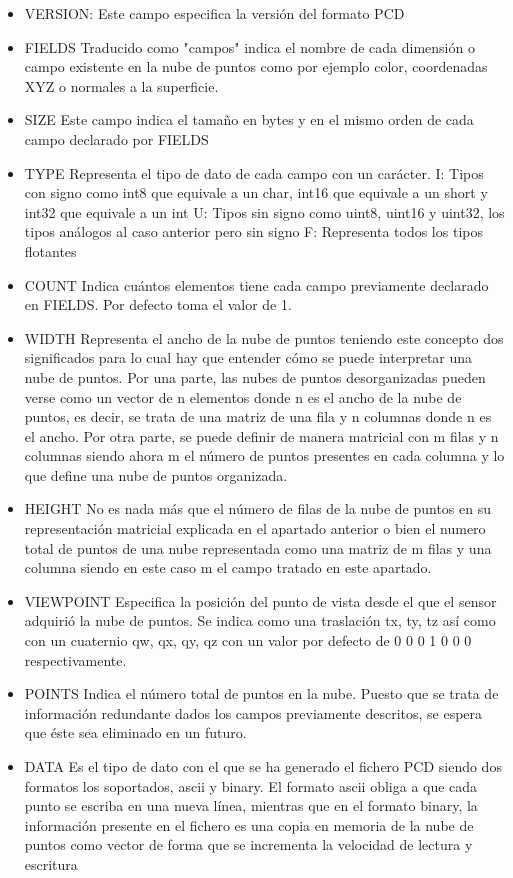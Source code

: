 \begin{itemize}
\item VERSION:
Este campo especifica la versión del formato PCD

\item FIELDS
Traducido como "campos" indica el nombre de cada dimensión o campo existente en la nube de puntos como por ejemplo color, coordenadas XYZ o normales a la superficie.

\item SIZE 
Este campo indica el tamaño en bytes y en el mismo orden de cada campo declarado por FIELDS 

\item TYPE
Representa el tipo de dato de cada campo con un carácter. 
I: Tipos con signo como int8 que equivale a un char, int16 que equivale a un short y int32 que equivale a un int
U: Tipos sin signo como uint8, uint16 y uint32, los tipos análogos al caso anterior pero sin signo
F: Representa todos los tipos flotantes

\item COUNT 
Indica cuántos elementos tiene cada campo previamente declarado en FIELDS. Por defecto toma el valor de 1.

\item WIDTH
Representa el ancho de la nube de puntos teniendo este concepto dos significados para lo cual hay que entender cómo se puede interpretar una nube de puntos. Por una parte, las nubes de puntos desorganizadas pueden verse como un vector de n elementos donde n es el ancho de la nube de puntos, es decir, se trata de una matriz de una fila y n columnas donde n es el ancho. Por otra parte, se puede definir de manera matricial con m filas y n columnas siendo ahora m el número de puntos presentes en cada columna y lo que define una nube de puntos organizada.

\item HEIGHT
No es nada más que el número de filas de la nube de puntos en su representación matricial explicada en el apartado anterior o bien el numero total de puntos de una nube representada como una matriz de m filas y una columna siendo en este caso m el campo tratado en este apartado.

\item VIEWPOINT
Especifica la posición del punto de vista desde el que el sensor adquirió la nube de puntos. Se indica como una traslación tx, ty, tz así como con un cuaternio qw, qx, qy, qz con un valor por defecto de 0 0 0 1 0 0 0 respectivamente.

\item POINTS
Indica el número total de puntos en la nube. Puesto que se trata de información redundante dados los campos previamente descritos, se espera que éste sea eliminado en un futuro.

\item DATA
Es el tipo de dato con el que se ha generado el fichero PCD siendo dos formatos los soportados, ascii y binary. El formato ascii obliga a que cada punto se escriba en una nueva línea, mientras que en el formato binary, la información presente en el fichero es una copia en memoria de la nube de puntos como vector de forma que se incrementa la velocidad de lectura y escritura
\end{itemize}
